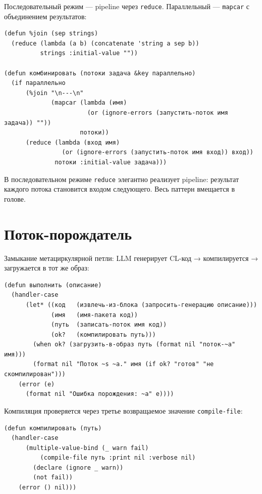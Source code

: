 \documentclass[11pt,a4paper]{article}
\begin{document}
Последовательный режим — pipeline через \texttt{reduce}. Параллельный — \texttt{mapcar} с объединением результатов:

\begin{lstlisting}[caption={мастер/cl/комбо.lisp}]
(defun %join (sep strings)
  (reduce (lambda (a b) (concatenate 'string a sep b))
          strings :initial-value ""))

(defun комбинировать (потоки задача &key параллельно)
  (if параллельно
      (%join "\n---\n"
             (mapcar (lambda (имя)
                       (or (ignore-errors (запустить-поток имя задача)) ""))
                     потоки))
      (reduce (lambda (вход имя)
                (or (ignore-errors (запустить-поток имя вход)) вход))
              потоки :initial-value задача)))
\end{lstlisting}

В последовательном режиме \texttt{reduce} элегантно реализует pipeline: результат каждого потока становится входом следующего. Весь паттерн вмещается в голове.

\section{Поток-порождатель}

Замыкание метациркулярной петли: LLM генерирует CL-код → компилируется → загружается в тот же образ:

\begin{lstlisting}[caption={мастер/потоки/порождатель.lisp — точка входа}]
(defun выполнить (описание)
  (handler-case
      (let* ((код   (извлечь-из-блока (запросить-генерацию описание)))
             (имя   (имя-пакета код))
             (путь  (записать-поток имя код))
             (ok?   (компилировать путь)))
        (when ok? (загрузить-в-образ путь (format nil "поток-~a" имя)))
        (format nil "Поток ~s ~a." имя (if ok? "готов" "не скомпилирован")))
    (error (e)
      (format nil "Ошибка порождения: ~a" e))))
\end{lstlisting}

Компиляция проверяется через третье возвращаемое значение \texttt{compile-file}:

\begin{lstlisting}[caption={мастер/потоки/порождатель.lisp — компиляция}]
(defun компилировать (путь)
  (handler-case
      (multiple-value-bind (_ warn fail)
          (compile-file путь :print nil :verbose nil)
        (declare (ignore _ warn))
        (not fail))
    (error () nil)))
\end{lstlisting}
\end{document}

